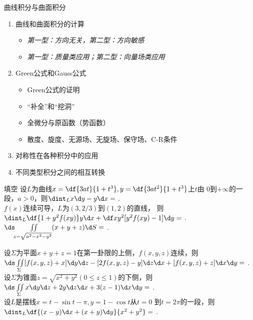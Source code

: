 \renewcommand{\b}{\color{blue!80!black}}

\begin{frame}{曲线积分与曲面积分}
	\linespread{1.2}
	\begin{enumerate}
	  \item 曲线和曲面积分的计算
	  \begin{itemize}
	    \item {\it 第一型：方向无关，第二型：方向敏感}
	    \item {\it 第一型：质量类应用；第二型：向量场类应用}
	  \end{itemize}
	  \item Green公式和Gauss公式
	  {\it
	  \begin{itemize}
	    \item Green公式的证明
	    \item “补全”和“挖洞”
	    \item 全微分与原函数（势函数）
	    \item 散度、旋度、无源场、无旋场、保守场、C-R条件
	  \end{itemize}
	  }
	  \item 对称性在各种积分中的应用
	  \item 不同类型积分之间的相互转换
	\end{enumerate}
\end{frame}

\begin{frame}{填空}
	\linespread{1.5}
	设$L$为曲线$x=\df{3at}{1+t^3},y=\df{3at^2}{1+t^3}$上$t$由
	$0$到$+\infty$的一段，$a>0$，则$\dint_Lx\d y-y\d x=$
	\underline{\uncover<2->{\;\b{$3a^2$}}\;}.\\[1em]
	
	$f(x)$连续可导，$L$为$(3,2/3)$到$(1,2)$的直线，
	则$\dint_L\df{1+y^2f(xy)}y\d x+\df x{y^2}[y^2f(xy)-1]\d y=$
	\underline{\uncover<3->{\;\b{$-4$}}\;}.\\[1em]
	
	$\ds\iint\limits_{z=\sqrt{a^2-x^2-y^2}}(x+y+z)\d S=$
	\underline{\uncover<4->{\;\b{$\pi a^3$}}\;}.\\[1em]
\end{frame}

\begin{frame}
	\linespread{1.5}
	设$\Sigma$为平面$x+y+z=1$在第一卦限的上侧，$f(x,y,z)$连续，则
	$\ds\iint\limits_{\Sigma}[f(x,y,z)+x]\d y\d z-[2f(x,y,z)-y]\d z\d x+
	[f(x,y,z)+z]\d x\d y=$
	\underline{\uncover<2->{\;\b{$\df12$}}\;}.\\[1em]
	
	设$\Sigma$为锥面$z=\sqrt{x^2+y^2}(0\leq z\leq 1)$的下侧，则
	$\ds\iint\limits_{\Sigma}x\d y\d z+2y\d z\d x+3(z-1)\d x\d y=$
	\underline{\uncover<3->{\;\b{$2\pi$}}\;}.\\[1em]
	
	设$L$是摆线$x=t-\sin t-\pi,y=1-\cos t$从$t=0$
	到$t=2\pi$的一段，则$\dint_L\df{(x-y)\d x+(x+y)\d y}{x^2+y^2}=$
	\underline{\uncover<4->{\;\b{$-\pi$}}\;}.\\[1em]
\end{frame}

